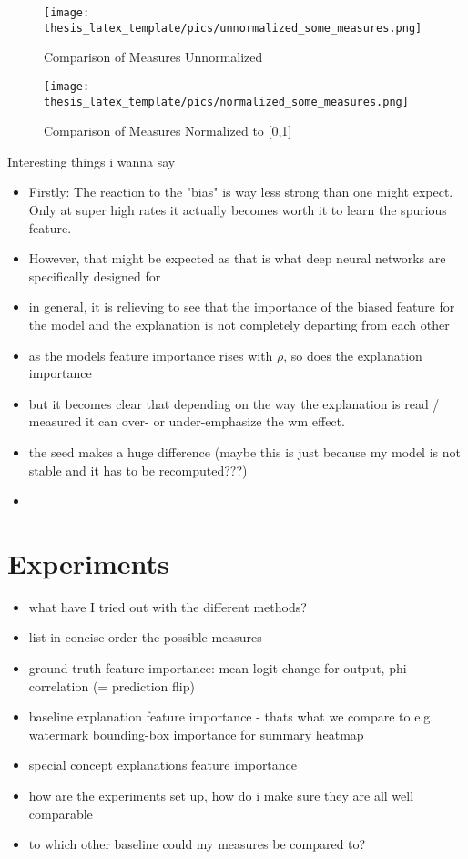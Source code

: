 \begin{figure}
    \centering
    \texttt{[image: thesis\_latex\_template/pics/unnormalized\_some\_measures.png]}
    \caption{Comparison of Measures Unnormalized}
    \label{fig:unnormalized}
\end{figure}


\begin{figure}
    \centering
    \texttt{[image: thesis\_latex\_template/pics/normalized\_some\_measures.png]}
    \caption{Comparison of Measures Normalized to [0,1]}
    \label{fig:normalized}
\end{figure}


Interesting things i wanna say
\begin{itemize}
    \item Firstly: The reaction to the "bias" is way less strong than one might expect. Only at super high rates it actually becomes worth it to learn the spurious feature.
    \item However, that might be expected as that is what deep neural networks are specifically designed for
    \item in general, it is relieving to see that the importance of the biased feature for the model and the explanation is not completely departing from each other
    \item as the models feature importance rises with $\rho$, so does the explanation importance
    \item but it becomes clear that depending on the way the explanation is read / measured it can over- or under-emphasize the wm effect. 
    \item the seed makes a huge difference (maybe this is just because my model is not stable and it has to be recomputed???) 
    \item 
\end{itemize}

\section{Experiments}
\begin{itemize}
    \item what have I tried out with the different methods?
    \item list in concise order the possible measures
    \item ground-truth feature importance: mean logit change for output, phi correlation (= prediction flip)
    \item baseline explanation feature importance - thats what we compare to e.g. watermark bounding-box importance for summary heatmap
    \item special concept explanations feature importance
    \item how are the experiments set up, how do i make sure they are all well comparable
    \item to which other baseline could my measures be compared to?
\end{itemize}

